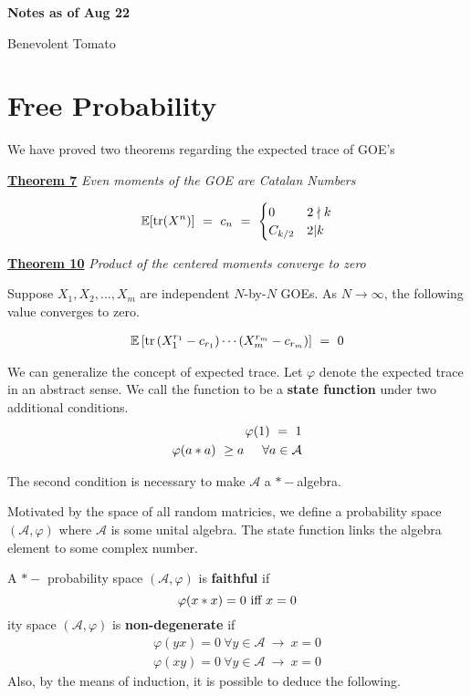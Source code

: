 \documentclass{article}
\newcommand{\new}[2]{
    \vspace{2mm}
    \noindent
    \textbf{
    \underline{#1}}
    \textit{{#2}}
    \
    \newline
}
\newcommand{\EE}{\mathbb{E}}
\newcommand{\tr}{\textnormal{tr}}
\begin{document}
\begin{center}
    \Large
    \textbf{Notes as of Aug 22}

    \large
    Benevolent Tomato
\end{center}

\section{Free Probability}
We have proved two theorems regarding the expected trace of GOE's

\new{Theorem 7}{Even moments of the GOE are Catalan Numbers}
\begin{eqnarray}
    \EE[\tr(X^n)] \ = \ c_n \ = \  \begin{cases}
        0 & 2 \nmid k \\ 
        C_{k/2} & 2 | k
    \end{cases}
\end{eqnarray}

\new{Theorem 10}{Product of the centered moments converge to zero}
Suppose $X_1, X_2, \dots, X_m$ are independent $N$-by-$N$ GOEs. As 
$N \rightarrow \infty$, the following value converges to zero. 

\begin{eqnarray}
    \EE \left[
        \tr\left(
            X_1^{r_1} - c_{r_1}
        \right)\cdots 
\left(
            X_m^{r_m} - c_{r_m}
        \right)
    \right] \ = \ 0
\end{eqnarray}

We can generalize the concept of expected trace. Let $\varphi$ 
denote the expected trace in an abstract sense. We call the function 
to be a \textbf{state function} under two additional conditions. 
\begin{eqnarray}
    \varphi(1) \ = \ 1 \nonumber \\
    \varphi(a* a) \ \geq a \hspace{5mm} \forall a \in \mathcal{A} 
\end{eqnarray}

The second condition is necessary to make $\mathcal A$ a $*-$algebra. 

Motivated by the space of all random matricies, we define a probability 
space $(\mathcal A, \varphi)$ where $\mathcal A$ is some unital algebra. 
The state function links the algebra element to some complex number. 

A $*-$ probability space $(\mathcal A, \varphi)$ is \textbf{faithful} 
if 
\begin{equation}
    \varphi(x*x) = 0 \ \textnormal{iff} \ x = 0 
\end{equation}
ity space $(\mathcal A, \varphi)$ is \textbf{non-degenerate} 
if 
\begin{eqnarray}
    \varphi(yx) = 0 \ \forall y \in \mathcal A \ \rightarrow \ x = 0\nonumber\\
    \varphi(xy) = 0 \ \forall y \in \mathcal A \ \rightarrow \ x = 0 
\end{eqnarray}
Also, by the means of induction, it is possible to deduce the following. 
\end{document}
